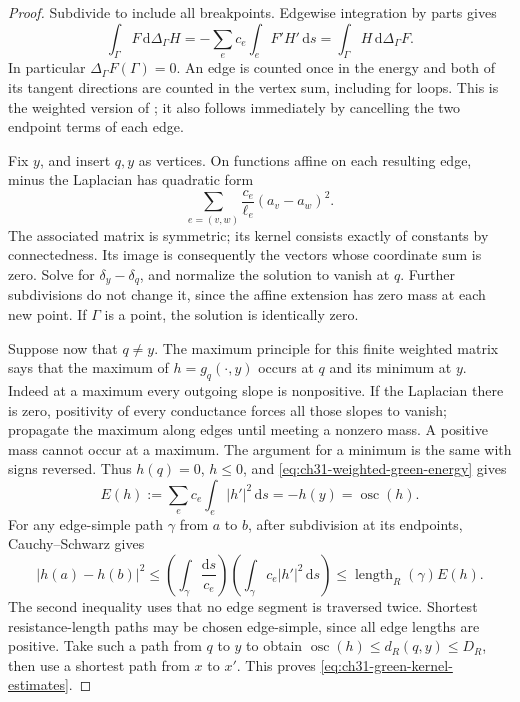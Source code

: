 \begin{proof}
Subdivide to include all breakpoints.  Edgewise integration by parts gives
\begin{equation}
\label{eq:ch31-weighted-green-energy}
 \int_\Gamma F\,\mathrm d\Delta_\Gamma H
   =-\sum_e c_e\int_e F'H'\,\mathrm ds
   =\int_\Gamma H\,\mathrm d\Delta_\Gamma F.
\end{equation}
In particular \(\Delta_\Gamma F(\Gamma)=0\).  An edge is counted once in the
energy and both of its tangent directions are counted in the vertex
sum, including for loops.  This is the weighted version of
\cite[Proposition~1.2.13]{Thu05}; it also follows immediately by
cancelling the two endpoint terms of each edge.

Fix \(y\), and insert \(q,y\) as vertices.  On functions affine on
each resulting edge, minus the Laplacian has quadratic form
\[
                 \sum_{e=(v,w)}\frac{c_e}{\ell_e}
                                      (a_v-a_w)^2.
\]
The associated matrix is symmetric; its kernel consists exactly of
constants by connectedness.  Its image is consequently the vectors
whose coordinate sum is zero.  Solve for \(\delta_y-\delta_q\),
and normalize the solution to vanish at \(q\).  Further subdivisions
do not change it, since the affine extension has zero mass at each
new point.  If \(\Gamma\) is a point, the solution is identically zero.

Suppose now that \(q\ne y\).  The maximum principle for this finite
weighted matrix says that the maximum of \(h=g_q(\cdot,y)\) occurs
at \(q\) and its minimum at \(y\).  Indeed at a maximum every
outgoing slope is nonpositive.  If the Laplacian there is zero,
positivity of every conductance forces all those slopes to vanish;
propagate the maximum along edges until meeting a nonzero mass.
A positive mass cannot occur at a maximum.  The argument for a
minimum is the same with signs reversed.  Thus \(h(q)=0\),
\(h\leq0\), and \eqref{eq:ch31-weighted-green-energy} gives
\[
 E(h):=\sum_e c_e\int_e|h'|^2\,\mathrm ds=-h(y)
                                         =\operatorname{osc}(h).
\]
For any edge-simple path \(\gamma\) from \(a\) to \(b\), after
subdivision at its endpoints, Cauchy--Schwarz gives
\[
 |h(a)-h(b)|^2
 \leq\left(\int_\gamma\frac{\mathrm ds}{c_e}\right)
       \left(\int_\gamma c_e|h'|^2\,\mathrm ds\right)
 \leq\operatorname{length}_R(\gamma)E(h).
\]
The second inequality uses that no edge segment is traversed twice.
Shortest resistance-length paths may be chosen edge-simple, since all
edge lengths are positive.  Take such a path from \(q\) to \(y\) to
obtain \(\operatorname{osc}(h)\leq d_R(q,y)\leq D_R\), then use
a shortest path from \(x\) to \(x'\).  This proves
\eqref{eq:ch31-green-kernel-estimates}.


\end{proof}

